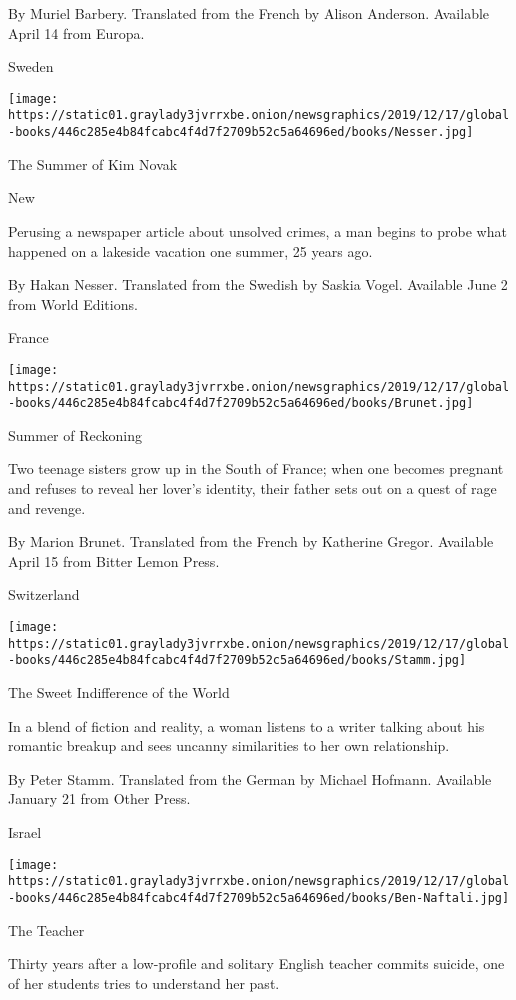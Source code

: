  By Muriel Barbery. Translated from the French by Alison Anderson.
Available April 14 from Europa.

Sweden

\texttt{[image: https://static01.graylady3jvrrxbe.onion/newsgraphics/2019/12/17/global-books/446c285e4b84fcabc4f4d7f2709b52c5a64696ed/books/Nesser.jpg]}

The Summer of Kim Novak

New

Perusing a newspaper article about unsolved crimes, a man begins to
probe what happened on a lakeside vacation one summer, 25 years ago.

 By Hakan Nesser. Translated from the Swedish by Saskia Vogel. Available
June 2 from World Editions.

France

\texttt{[image: https://static01.graylady3jvrrxbe.onion/newsgraphics/2019/12/17/global-books/446c285e4b84fcabc4f4d7f2709b52c5a64696ed/books/Brunet.jpg]}

Summer of Reckoning

Two teenage sisters grow up in the South of France; when one becomes
pregnant and refuses to reveal her lover's identity, their father sets
out on a quest of rage and revenge.

 By Marion Brunet. Translated from the French by Katherine Gregor.
Available April 15 from Bitter Lemon Press.

Switzerland

\texttt{[image: https://static01.graylady3jvrrxbe.onion/newsgraphics/2019/12/17/global-books/446c285e4b84fcabc4f4d7f2709b52c5a64696ed/books/Stamm.jpg]}

The Sweet Indifference of the World

In a blend of fiction and reality, a woman listens to a writer talking
about his romantic breakup and sees uncanny similarities to her own
relationship.

 By Peter Stamm. Translated from the German by Michael Hofmann.
Available January 21 from Other Press.

Israel

\texttt{[image: https://static01.graylady3jvrrxbe.onion/newsgraphics/2019/12/17/global-books/446c285e4b84fcabc4f4d7f2709b52c5a64696ed/books/Ben-Naftali.jpg]}

The Teacher

Thirty years after a low-profile and solitary English teacher commits
suicide, one of her students tries to understand her past.

